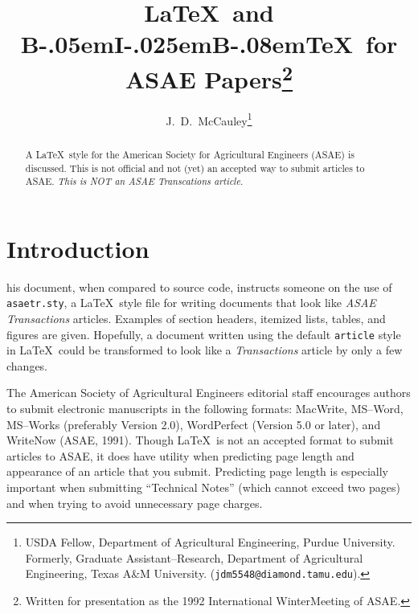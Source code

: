 \title{\LaTeX\ and  
       B\kern-.05em{\large I}\kern-.025em{\large B}\kern-.08em\TeX\ 
       for ASAE Papers\thanks{Written for presentation as the 1992 
               International WinterMeeting of ASAE.}
      }
\author{J.~D.~McCauley\thanks{USDA Fellow, Department of Agricultural
       Engineering, Purdue University. Formerly, 
       Graduate Assistant--Research, Department of Agricultural
       Engineering, Texas A\&M University. ({\tt jdm5548@diamond.tamu.edu}).}
       \student
       }


\maketitle

\begin{abstract}
A \LaTeX\ style for the American Society for Agricultural Engineers
(ASAE) is discussed. This is not official and not (yet) an accepted
way to submit articles to ASAE.  {\em This is NOT an ASAE Transcations
article.} \keywords{\LaTeX,\ \BibTeX,\ typesetting, ASAE Transactions.}
\end{abstract}

\section{Introduction}
his document, when compared to source code,
instructs someone on the use of {\tt asaetr.sty}, a \LaTeX\ style file
for writing documents that look like {\it ASAE Transactions} articles.
Examples of section headers, itemized lists, tables, and figures are
given. Hopefully, a document written using the default {\tt article}
style in \LaTeX\ could be transformed to look like a {\em
Transactions} article by only a few changes.

The American Society of Agricultural Engineers editorial staff
encourages authors to submit electronic manuscripts in the following
formats: MacWrite, MS--Word, MS--Works (preferably Version 2.0),
WordPerfect (Version 5.0 or later), and WriteNow \cite{asaeins} (ASAE,
1991).  Though \LaTeX\ is not an accepted format to submit articles to
ASAE, it does have utility when predicting page length and appearance
of an article that you submit. Predicting page length is especially
important when submitting ``Technical Notes'' (which cannot exceed two
pages) and when trying to avoid unnecessary page charges.

